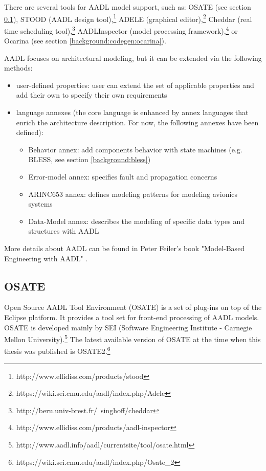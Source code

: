 There are several tools for AADL model support, such as: OSATE (see section \ref{background:aadl:osate}), STOOD (AADL design tool),\footnote{http://www.ellidiss.com/products/stood} ADELE (graphical editor),\footnote{https://wiki.sei.cmu.edu/aadl/index.php/Adele} Cheddar (real time scheduling tool),\footnote{http://beru.univ-brest.fr/~singhoff/cheddar} AADLInspector (model processing framework),\footnote{http://www.ellidiss.com/products/aadl-inspector} or Ocarina (see section \ref{background:codegen:ocarina}).

AADL focuses on architectural modeling, but it can be extended via the following methods:
\begin{itemize}
	\item user-defined properties: user can extend the set of applicable properties and add their own to specify their own requirements
	\item {language annexes (the core language is enhanced by annex languages that enrich the architecture description. For now, the following annexes have been defined):
		\begin{itemize}
			\item Behavior annex: add components behavior with state machines (e.g. BLESS, see section \ref{background:bless})
			\item Error-model annex: specifies fault and propagation concerns
			\item ARINC653 annex: defines modeling patterns for modeling avionics systems
			\item Data-Model annex: describes the modeling of specific data types and structures with AADL
		\end{itemize}
		}
\end{itemize}


More details about AADL can be found in Peter Feiler's book "Model-Based Engineering with AADL" \cite{AadlBook}.


\subsection{OSATE}
\label{background:aadl:osate}

Open Source AADL Tool Environment (OSATE) is a set of plug-ins on top of the Eclipse platform. It provides a tool set for front-end processing of AADL models. OSATE is developed mainly by SEI (Software Engineering Institute - Carnegie Mellon University).\footnote{http://www.aadl.info/aadl/currentsite/tool/osate.html} The latest available version of OSATE at the time when this thesis was published is OSATE2.\footnote{https://wiki.sei.cmu.edu/aadl/index.php/Osate\_2} 

